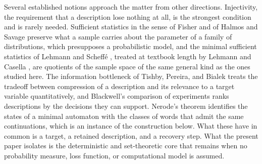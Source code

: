 \documentclass[11pt]{article}
\theoremstyle{definition}
\theoremstyle{remark}
\begin{document}
Several established notions approach the matter from other directions. Injectivity, the requirement that a description lose nothing at all, is the strongest condition and is rarely needed. Sufficient statistics in the sense of Fisher \cite{fisher} and of Halmos and Savage \cite{halmos} preserve what a sample carries about the parameter of a family of distributions, which presupposes a probabilistic model, and the minimal sufficient statistics of Lehmann and Scheff\'e \cite{lehmann}, treated at textbook length by Lehmann and Casella \cite{lehmanncasella}, are quotients of the sample space of the same general kind as the ones studied here. The information bottleneck of Tishby, Pereira, and Bialek \cite{tishby} treats the tradeoff between compression of a description and its relevance to a target variable quantitatively, and Blackwell's comparison of experiments \cite{blackwell} ranks descriptions by the decisions they can support. Nerode's theorem \cite{nerode} identifies the states of a minimal automaton with the classes of words that admit the same continuations, which is an instance of the construction below. What these have in common is a target, a retained description, and a recovery step. What the present paper isolates is the deterministic and set-theoretic core that remains when no probability measure, loss function, or computational model is assumed.
\end{document}
